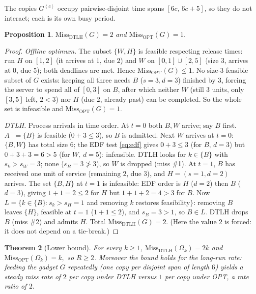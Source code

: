 \documentclass{amsart}
\newtheorem{theorem}{Theorem}
\newtheorem{proposition}[theorem]{Proposition}
\theoremstyle{definition}
\begin{document}
The copies $G^{(c)}$ occupy pairwise-disjoint time spans
$[6c,\,6c+5]$, so they do not interact; each is its own busy period.

\begin{proposition}\label{prop:gadget}
$\mathrm{Miss}_{\mathrm{DTLH}}(G)=2$ and $\mathrm{Miss}_{\mathrm{OPT}}(G)=1$.
\end{proposition}

\begin{proof}
\emph{Offline optimum.} The subset $\{W,H\}$ is feasible respecting release
times: run $H$ on $[1,2]$ (it arrives at $1$, due $2$) and $W$ on
$[0,1]\cup[2,5]$ (size $3$, arrives at $0$, due $5$); both deadlines are met.
Hence $\mathrm{Miss}_{\mathrm{OPT}}(G)\le 1$. No size-$3$ feasible subset of $G$
exists: keeping all three needs $B$ ($s=3,d=3$) finished by $3$, forcing the
server to spend all of $[0,3]$ on $B$, after which neither $W$ (still $3$ units,
only $[3,5]$ left, $2<3$) nor $H$ (due $2$, already past) can be completed. So
the whole set is infeasible and $\mathrm{Miss}_{\mathrm{OPT}}(G)=1$.

\emph{DTLH.} Process arrivals in time order.
At $t=0$ both $B,W$ arrive; say $B$ first. $A^-=\{B\}$ is feasible
($0+3\le 3$), so $B$ is admitted. Next $W$ arrives at $t=0$:
$\{B,W\}$ has total size $6$; the EDF test \eqref{eq:edf} gives
$0+3\le 3$ (for $B$, $d=3$) but $0+3+3=6>5$ (for $W$, $d=5$): infeasible.
DTLH looks for $k\in\{B\}$ with $s_k>s_W=3$; none ($s_B=3\not>3$), so $W$ is
dropped (miss \#1). At $t=1$, $B$ has received one unit of service (remaining
$2$, due $3$), and $H=(s{=}1,d{=}2)$ arrives. The set $\{B,H\}$ at $t=1$ is
infeasible: EDF order is $H$ ($d=2$) then $B$ ($d=3$), giving $1+1=2\le2$ for
$H$ but $1+1+2=4>3$ for $B$. Now $L=\{k\in\{B\}: s_k>s_H=1$ and removing $k$
restores feasibility$\}$: removing $B$ leaves $\{H\}$, feasible at $t=1$
($1+1\le 2$), and $s_B=3>1$, so $B\in L$. DTLH drops $B$ (miss \#2) and admits
$H$. Total $\mathrm{Miss}_{\mathrm{DTLH}}(G)=2$. (Here the value $2$ is forced:
it does not depend on a tie-break.)
\end{proof}

\begin{theorem}[Lower bound]\label{thm:lb}
For every $k\ge1$,
\(
\mathrm{Miss}_{\mathrm{DTLH}}(\Omega_k)=2k
\)
and
\(
\mathrm{Miss}_{\mathrm{OPT}}(\Omega_k)=k,
\)
so $R\ge 2$. Moreover the bound holds for the long-run \emph{rate}: feeding the
gadget $G$ repeatedly (one copy per disjoint span of length $6$) yields a steady
miss rate of $2$ per copy under DTLH versus $1$ per copy under OPT, a rate ratio
of $2$.
\end{theorem}
\end{document}
